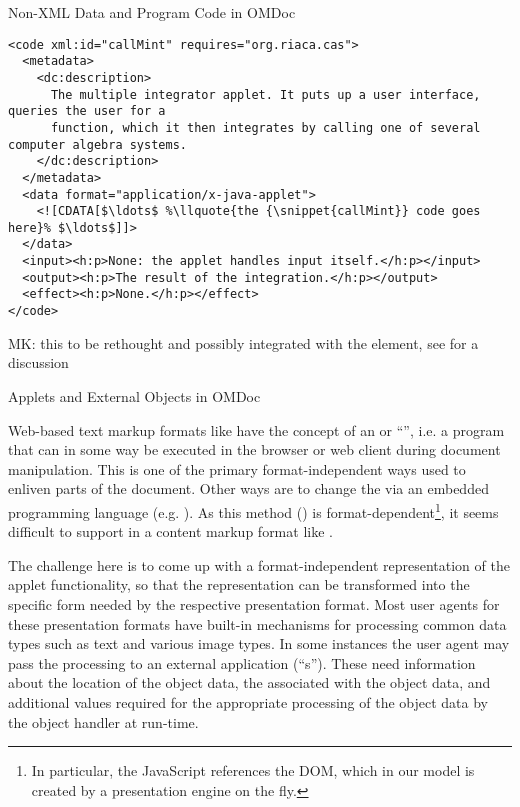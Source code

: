 \begin{module}[id=ext]
\begin{omgroup}[id=ext,short=Auxiliary Elements]
\begin{omgroup}[id=private]{Non-XML Data and Program Code in OMDoc}
\begin{lstlisting}[label=lst:callMint,mathescape,escapechar=\%,
  caption={The Program Code for a Java Applet},
  index={code,input,output,effect,data}]
<code xml:id="callMint" requires="org.riaca.cas"> 
  <metadata>
    <dc:description>
      The multiple integrator applet. It puts up a user interface, queries the user for a 
      function, which it then integrates by calling one of several computer algebra systems. 
    </dc:description>
  </metadata>
  <data format="application/x-java-applet">
    <![CDATA[$\ldots$ %\llquote{the {\snippet{callMint}} code goes here}% $\ldots$]]>
  </data> 
  <input><h:p>None: the applet handles input itself.</h:p></input> 
  <output><h:p>The result of the integration.</h:p></output>
  <effect><h:p>None.</h:p></effect> 
</code>
\end{lstlisting}
\end{omgroup}

\begin{oldpart}{MK: this to be rethought and possibly integrated with the
    {} element, see  for a discussion}
\begin{omgroup}[id=applets]{Applets and External Objects in OMDoc}

Web-based text markup formats like {\html} have the concept of an
{} or ``{}'', i.e.  a program that can in some
way be executed in the browser or web client during document manipulation. This is one of
the primary format-independent ways used to enliven parts of the document.  Other ways are
to change the {} via an embedded programming language
(e.g.  {}). As this method ({}) is
format-dependent\footnote{In particular, the JavaScript references the {\html} DOM, which
  in our model is created by a presentation engine on the fly.}, it seems difficult to
support in a content markup format like {\omdoc}.
  
The challenge here is to come up with a format-independent representation of the applet
functionality, so that the {\omdoc} representation can be transformed into the specific
form needed by the respective presentation format.  Most user agents for these
presentation formats have built-in mechanisms for processing common data types such as
text and various image types. In some instances the user agent may pass the processing to
an external application (``{s}'').  These need information about the
location of the object data, the {} associated with the object data,
and additional values required for the appropriate processing of the object data by the
object handler at run-time.


\end{omgroup}
\end{oldpart}
\end{omgroup}
\end{module}
